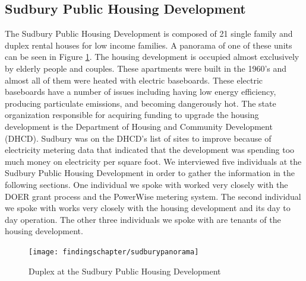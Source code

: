 \subsection{Sudbury Public Housing Development}
\par The Sudbury Public Housing Development is composed of 21 single family and duplex rental houses for low income families. A panorama of one of these units can be seen in Figure \ref{fig:sudburypano}. The housing development is occupied almost exclusively by elderly people and couples. These apartments were built in the 1960's and almost all of them were heated with electric baseboards. These electric baseboards have a number of issues including having low energy efficiency, producing particulate emissions, and becoming dangerously hot. The state organization responsible for acquiring funding to upgrade the housing development is the Department of Housing and Community Development (DHCD). Sudbury was on the DHCD's list of sites to improve because of electricity metering data that indicated that the development was spending too much money on electricity per square foot. We interviewed five individuals at the Sudbury Public Housing Development in order to gather the information in the following sections. One individual we spoke with worked very closely with the DOER grant process and the PowerWise metering system. The second individual we spoke with works very closely with the housing development and its day to day operation. The other three individuals we spoke with are tenants of the housing development.
\begin{figure}[H]
\centering
\texttt{[image: findingschapter/sudburypanorama]}
\caption{Duplex at the Sudbury Public Housing Development}
\label{fig:sudburypano}
\end{figure}

